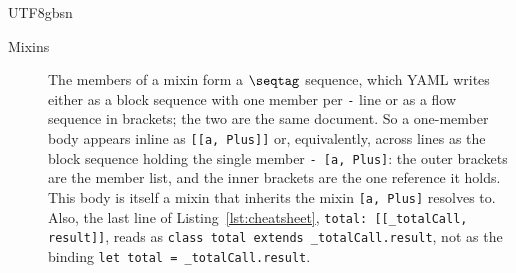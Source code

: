 \begin{CJK*}{UTF8}{gbsn}
\begin{description}
  \item[Mixins]
    The members of a mixin form a $\seqtag$ sequence, which YAML writes either as a block sequence with one member per \texttt{-} line or as a flow sequence in brackets; the two are the same document. So a one-member body appears inline as \texttt{[[a, Plus]]} or, equivalently, across lines as the block sequence holding the single member \texttt{- [a, Plus]}: the outer brackets are the member list, and the inner brackets are the one reference it holds. This body is itself a mixin that inherits the mixin \texttt{[a, Plus]} resolves to. Also, the last line of Listing~\ref{lst:cheatsheet}, \texttt{total: [[_totalCall, result]]}, reads as \texttt{class total extends _totalCall.result}, not as the binding \texttt{let total = _totalCall.result}.
\end{description}
\fi



\end{CJK*}
